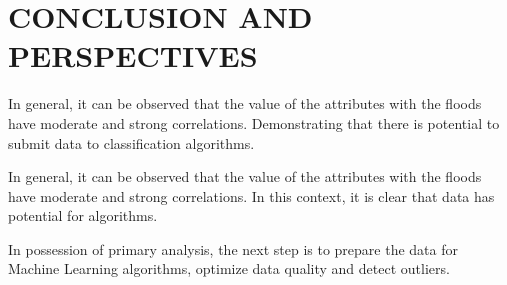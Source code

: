 \chapter{CONCLUSION AND PERSPECTIVES} \label{Cron}

In general, it can be observed that the value of the attributes with the floods have moderate and strong correlations. Demonstrating that there is potential to submit data to classification algorithms.

In general, it can be observed that the value of the attributes with the floods have moderate and strong correlations. In this context, it is clear that data has potential for algorithms.

In possession of primary analysis, the next step is to prepare the data for Machine Learning algorithms, optimize data quality and detect outliers. 


